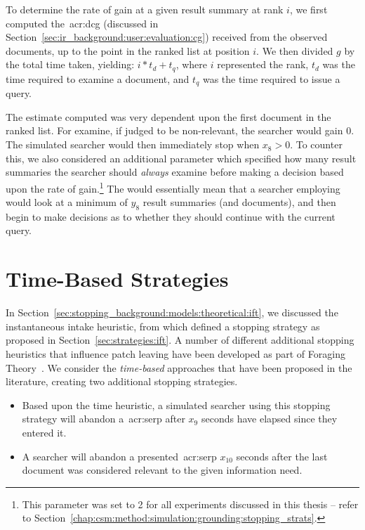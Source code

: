 To determine the rate of gain at a given result summary at rank $i$, we first computed the~\gls{acr:dcg} (discussed in Section~\ref{sec:ir_background:user:evaluation:cg}) received from the observed documents, up to the point in the ranked list at position $i$. We then divided $g$ by the total time taken, yielding: $i * t_d + t_q$, where $i$ represented the rank, $t_d$ was the time required to examine a document, and $t_q$ was the time required to issue a query.

The estimate computed was very dependent upon the first document in the ranked list. For examine, if judged to be non-relevant, the searcher would gain $0$. The simulated searcher would then immediately stop when $x_8 > 0$. To counter this, we also considered an additional parameter which specified how many result summaries the searcher should \emph{always} examine before making a decision based upon the rate of gain.\footnote{This parameter was set to 2 for all experiments discussed in this thesis -- refer to Section~\ref{chap:csm:method:simulation:grounding:stopping_strats}.} The would essentially mean that a searcher employing  would look at a minimum of $y_8$ result summaries (and documents), and then begin to make decisions as to whether they should continue with the current query.

\section{Time-Based Strategies}\label{sec:strategies:time}
In Section~\ref{sec:stopping_background:models:theoretical:ift}, we discussed the instantaneous intake heuristic, from which defined a stopping strategy as proposed in Section~\ref{sec:strategies:ift}. A number of different additional stopping heuristics that influence patch leaving have been developed as part of Foraging Theory~\citep{stephens1986foraging_theory}. We consider the \emph{time-based} approaches that have been proposed in the literature, creating two additional stopping strategies.

\begin{itemize}
    \item{ Based upon the time heuristic, a simulated searcher using this stopping strategy will abandon a~\gls{acr:serp} after $x_9$ seconds have elapsed since they entered it.}
    
    \item{ A searcher will abandon a presented~\gls{acr:serp} $x_{10}$ seconds after the last document was considered relevant to the given information need.}
\end{itemize}

